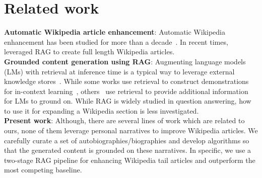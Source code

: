 \section{Related work}
\label{sec:related_work}
\noindent \textbf{Automatic Wikipedia article enhancement}: Automatic Wikipedia enhancement has been studied for more than a decade~\cite{10.1145/2682571.2797073,j.2018generating, fan2022generating, banerjee2016wikiwrite, zhang2024retrievalbasedfulllengthwikipediageneration}. In recent times, \citet{zhang2024retrievalbasedfulllengthwikipediageneration} leveraged RAG to create full length Wikipedia articles.\\ %
\noindent\textbf{Grounded content generation using RAG}: Augmenting language models (LMs) with retrieval at inference time is a typical way to leverage external knowledge stores~\citep{ram2023ralm,JMLR:v24:23-0037}. While some works use retrieval to construct demonstrations for in-context learning~\citep{poesia2022synchromesh,khattab2022demonstrate}, others~\cite{lewis2020retrieval,menick2022teaching,gao-etal-2023-enabling,bohnet2023attributed,qian2023webbrainlearninggeneratefactually} use retrieval to provide additional information for LMs to ground on.
While RAG is widely studied in question answering, how to use it for expanding a Wikipedia section is less investigated.\\
\noindent \textbf{Present work}: Although, there are several lines of work which are related to ours, none of them leverage personal narratives to improve Wikipedia articles. We carefully curate a set of autobiographies/biographies and develop algorithms so that the generated content is grounded on these narratives. In specific, we use a two-stage RAG pipeline for enhancing Wikipedia tail articles and outperform the most competing baseline.

